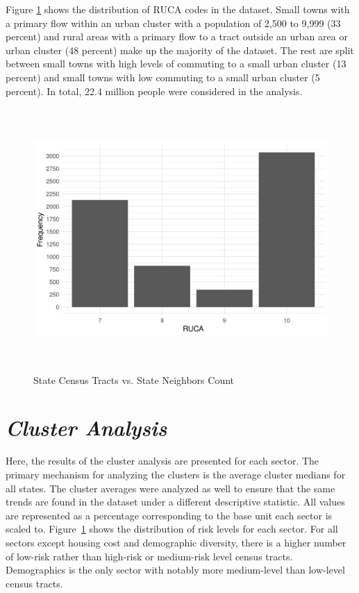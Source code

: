 Figure \ref{fig:ruca_frequency} shows the distribution of RUCA codes in the dataset. Small towns with a primary flow within an urban cluster with a population of 2,500 to 9,999 (33 percent) and rural areas with a primary flow to a tract outside an urban area or urban cluster (48 percent) make up the majority of the dataset. The rest are split between small towns with high levels of commuting to a small urban cluster (13 percent) and small towns with low commuting to a small urban cluster  (5 percent). In total, 22.4 million people were considered in the analysis. 

\begin{figure}[htbp]
    \centering
     \includegraphics[width=1\textwidth, height=10cm]{plots/ruca_frequency.png}
     \caption{State Census Tracts vs. State Neighbors Count}
     \label{fig:ruca_frequency}
 \end{figure}
 


\section{\textit{Cluster Analysis}}
Here, the results of the cluster analysis are presented for each sector. The primary mechanism for analyzing the clusters is the average cluster medians for all states. The cluster averages were analyzed as well to ensure that the same trends are found in the dataset under a different descriptive statistic. All values are represented as a percentage corresponding to the base unit each sector is scaled to. Figure~\ref{fig:ruca_frequency} shows the distribution of risk levels for each sector. For all sectors except housing cost and demographic diversity, there is a higher number of low-risk rather than high-risk or medium-risk level census tracts. Demographics is the only sector with notably more medium-level than low-level census tracts. 

